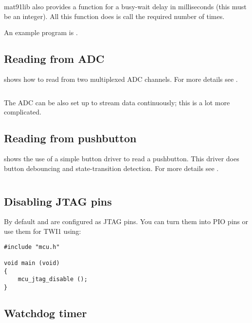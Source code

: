 mat91lib also provides a function  for a busy-wait
delay in milliseconds (this must be an integer).  All this function
does is call  the required number of times.

An example program is .


\subsection{Reading from ADC}
\label{ADC}

 shows
how to read from two multiplexed ADC channels.  For more details
see .

\inputminted{C}{../../src/test-apps/adc_usb_serial_test2/adc_usb_serial_test2.c}

The ADC can be also set up to stream data continuously; this is a lot
more complicated.


\subsection{Reading from pushbutton}
\label{pushbutton}

 shows the use of a
simple button driver to read a pushbutton.  This driver does button
debouncing and state-transition detection.  For more details see
.

\inputminted{C}{../../src/test-apps/button_test2/button_test2.c}



\subsection{Disabling JTAG pins}
\label{disabling-jtag-pins}

By default  and  are configured as JTAG pins. You can turn
them into PIO pins or use them for TWI1 using:
%
\begin{verbatim}
#include "mcu.h"

void main (void)
{
    mcu_jtag_disable ();
}
\end{verbatim}

\subsection{Watchdog timer}
\label{watchdog-timer}


